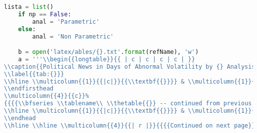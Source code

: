 \begin{lstlisting}[language=Python]
    lista = list()
    if np == False:
        anal = 'Parametric'
    else:
        anal = 'Non Parametric'

    b = open('latex/ables/{}.txt'.format(refName), 'w')
    a = '''\\begin{{longtable}}{{ | c | c | c | c | }}
\\caption{{Political News in Days of Abnormal Volatility by {} Analysis}}
\\label{{tab:{}}}
\\hline \\multicolumn{{1}}{{|c|}}{{\\textbf{{}}}} & \\multicolumn{{1}}{{c|}}{{\\textbf{{Ab. Vol.}}}} & \\multicolumn{{1}}{{c|}}{{\\textbf{{News Time}}}} & \\multicolumn{{1}}{{c|}}{{\\textbf{{Headline}}}} \\\\ \\hline \\hline
\\endfirsthead
\\multicolumn{{4}}{{c}}%
{{{{\\bfseries \\tablename\\ \\thetable{{}} -- continued from previous page}}}} \\\\
\\hline \\multicolumn{{1}}{{|c|}}{{\\textbf{{}}}} & \\multicolumn{{1}}{{c|}}{{\\textbf{{Ab. Vol.}}}} & \\multicolumn{{1}}{{c|}}{{\\textbf{{News Time}}}} & \\multicolumn{{1}}{{c|}}{{\\textbf{{Headline}}}} \\\\ \\hline \\hline
\\endhead
\\hline \\hline \\multicolumn{{4}}{{| r |}}{{{{Continued on next page}}}} \\\\ \\hline

\end{lstlisting}
